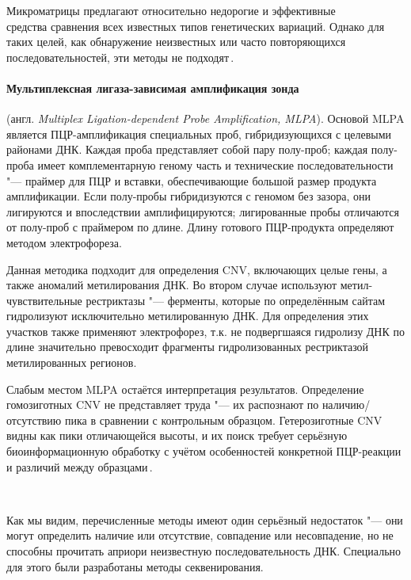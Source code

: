 \documentclass[a4paper,14pt]{extarticle}
\newcommand{\ecitep}[1]{\textenglish{\citep{#1}}}
\newcommand{\engterm}[1]{англ. \textenglish{\textit{#1}}}
\begin{document}
Микроматрицы предлагают относительно недорогие и эффективные\\средства сравнения всех известных типов генетических вариаций.
Однако для таких целей, как обнаружение неизвестных или часто повторяющихся последовательностей, эти методы не подходят\,\ecitep{Gresham_2008}.

\paragraph{Мультиплексная лигаза-зависимая амплификация зонда} (\engterm{Multiplex Ligation-dependent Probe Amplification, MLPA}).
Основой MLPA является ПЦР\hyp{}амплификация специальных проб, гибридизующихся с целевыми районами ДНК.
Каждая проба представляет собой пару полу-проб;
каждая полу-проба имеет комплементарную геному часть и технические последовательности "--- праймер для ПЦР и вставки, обеспечивающие большой размер продукта амплификации.
Если полу-пробы гибридизуются с геномом без зазора, они лигируются и впоследствии амплифицируются;
лигированные пробы отличаются от полу-проб с праймером по длине.
Длину готового ПЦР\hyp{}продукта определяют методом электрофореза.

Данная методика подходит для определения CNV, включающих целые гены, а также аномалий метилирования ДНК.
Во втором случае используют метил-чувствительные рестриктазы "--- ферменты, которые по определённым сайтам гидролизуют исключительно метилированную ДНК.
Для определения этих участков также применяют электрофорез, т.к. не подвергшаяся гидролизу ДНК по длине значительно превосходит фрагменты гидролизованных рестриктазой метилированных регионов.

Слабым местом MLPA остаётся интерпретация результатов.
Определение гомозиготных CNV не представляет труда "--- их распознают по наличию/отсутствию пика в сравнении с контрольным образцом.
Гетерозиготные CNV видны как пики отличающейся высоты, и их поиск требует серьёзную биоинформационную обработку с учётом особенностей конкретной ПЦР\hyp{}реакции и различий между образцами\,\ecitep{Stuppia_2012}.

~

Как мы видим, перечисленные методы имеют один серьёзный недостаток "--- они могут определить наличие или отсутствие, совпадение или несовпадение, но не способны прочитать априори неизвестную последовательность ДНК.
Специально для этого были разработаны методы секвенирования.
\end{document}
